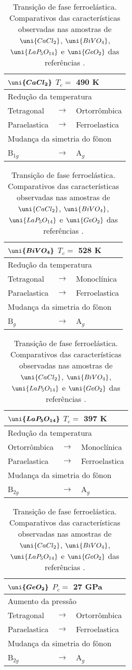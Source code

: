 \begin{table}[h!] \centering
	\begin{tabular}{lcl} \hline
		\multicolumn{3}{l}{$\boldsymbol{\uni{CaCl_2}}$ \quad $T_c =$ 490 K} \\ \hline
		\multicolumn{3}{l}{Redução da temperatura} \\ \hline
		Tetragonal & $\rightarrow$ & Ortorrômbica \\ 
		Paraelastica & $\rightarrow$ & Ferroelastica \\ \hline
		\multicolumn{3}{l}{Mudança da simetria do fônon} \\ \hline
		B$_{1g}$ & $\rightarrow$ & A$_{g}$ \\ \hline
	\end{tabular}

	\begin{tabular}{lcl} \hline
		\multicolumn{3}{l}{$\boldsymbol{\uni{BiVO_4}}$ \quad $T_c =$ 528 K} \\ \hline 
		\multicolumn{3}{l}{Redução da temperatura} \\ \hline
		Tetragonal & $\rightarrow$ & Monoclínica \\ 
		Paraelastica & $\rightarrow$ & Ferroelastica \\ \hline
		\multicolumn{3}{l}{Mudança da simetria do fônon} \\ \hline
		B$_{g}$ & $\rightarrow$ & A$_{g}$ \\ \hline
	\end{tabular}

	\begin{tabular}{lcl} \hline
		\multicolumn{3}{l}{$\boldsymbol{\uni{LaP_5O_{14}}}$ \quad $T_c =$ 397 K} \\ \hline 
		\multicolumn{3}{l}{Redução da temperatura} \\ \hline
		Ortorrômbica & $\rightarrow$ & Monoclínica \\ 
		Paraelastica & $\rightarrow$ & Ferroelastica \\ \hline
		\multicolumn{3}{l}{Mudança da simetria do fônon} \\ \hline
		B$_{2g}$ & $\rightarrow$ & A$_{g}$ \\ \hline
	\end{tabular}

	\begin{tabular}{lcl} \hline
		\multicolumn{3}{l}{$\boldsymbol{\uni{GeO_2}}$ \quad $P_c =$ 27 GPa} \\ \hline
		\multicolumn{3}{l}{Aumento da pressão} \\ \hline
		Tetragonal & $\rightarrow$ & Ortorrômbica \\ 
		Paraelastica & $\rightarrow$ & Ferroelastica \\ \hline
		\multicolumn{3}{l}{Mudança da simetria do fônon} \\ \hline
		B$_{2g}$ & $\rightarrow$ & A$_{g}$ \\ \hline
	\end{tabular}
	\caption{Transição de fase ferroelástica. Comparativos das características observadas nas amostras de $\uni{CaCl_2}$, $\uni{BiVO_4}$, $\uni{LaP_5O_{14}}$ e $\uni{GeO_2}$ das referências \cite{unruh1992, pinczuk1977, errandonea1981, haines1998}.}
	\label{t_ferro}
\end{table}

